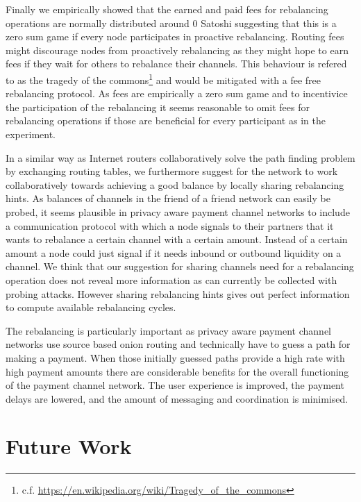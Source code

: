 \documentclass[a4paper]{paper}
\begin{document}
Finally we empirically showed that the earned and paid fees for rebalancing operations are normally distributed around $0$ Satoshi suggesting that this is a zero sum game if every node participates in proactive rebalancing.
Routing fees might discourage nodes from proactively rebalancing as they might hope to earn fees if they wait for others to rebalance their channels.
This behaviour is refered to as the tragedy of the commons\footnote{c.f. \url{https://en.wikipedia.org/wiki/Tragedy_of_the_commons}} and would be mitigated with a fee free rebalancing protocol.
As fees are empirically a zero sum game and to incentivice the participation of the rebalancing it seems reasonable to omit fees for rebalancing operations if those are beneficial for every participant as in the experiment.

In a similar way as Internet routers collaboratively solve the path finding problem by exchanging routing tables, we furthermore suggest for the network to work collaboratively towards achieving a good balance by locally sharing rebalancing hints. 
As balances of channels in the friend of a friend network can easily be probed, it seems plausible in privacy aware payment channel networks to include a communication protocol with which a node signals to their partners that it wants to rebalance a certain channel with a certain amount.
Instead of a certain amount a node could just signal if it needs inbound or outbound liquidity on a channel. 
We think that our suggestion for sharing channels need for a rebalancing operation does not reveal more information as can currently be collected with probing attacks.
However sharing rebalancing hints gives out perfect information to compute available rebalancing cycles.

The rebalancing is particularly important as privacy aware payment channel networks use source based onion routing and technically have to guess a path for making a payment.
When those initially guessed paths provide a high rate with high payment amounts there are considerable benefits for the overall functioning of the payment channel network. 
The user experience is improved, the payment delays are lowered, and the amount of messaging and coordination is minimised.

\section{Future Work}
\label{sec:future}
\end{document}
